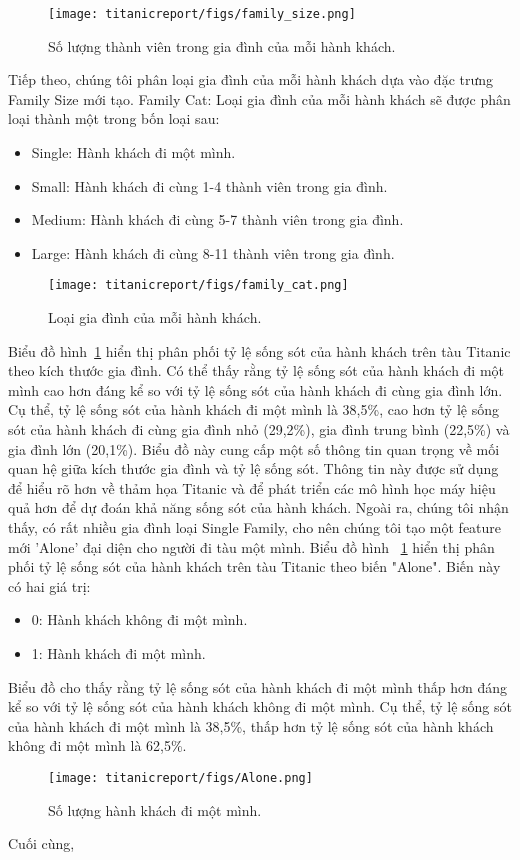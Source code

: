 \documentclass[11pt]{article}
\begin{document}
\begin{figure}[ht]
    \centering
    \texttt{[image: titanicreport/figs/family\_size.png]}
    \caption{Số lượng thành viên trong gia đình của mỗi hành khách.}
\end{figure}
Tiếp theo, chúng tôi phân loại gia đình của mỗi hành khách dựa vào đặc trưng Family Size mới tạo. Family Cat: Loại gia đình của mỗi hành khách sẽ được phân loại thành một trong bốn loại sau:
\begin{itemize}
    \item Single: Hành khách đi một mình.
    \item Small: Hành khách đi cùng 1-4 thành viên trong gia đình.
    \item Medium: Hành khách đi cùng 5-7 thành viên trong gia đình.
    \item Large: Hành khách đi cùng 8-11 thành viên trong gia đình.     
\end{itemize}
\begin{figure}[ht]
    \centering
    \texttt{[image: titanicreport/figs/family\_cat.png]}
    \caption{Loại gia đình của mỗi hành khách.}
    \label{fig:family_cat}
\end{figure}
Biểu đồ hình~\ref{fig:family_cat} hiển thị phân phối tỷ lệ sống sót của hành khách trên tàu Titanic theo kích thước gia đình. Có thể thấy rằng tỷ lệ sống sót của hành khách đi một mình cao hơn đáng kể so với tỷ lệ sống sót của hành khách đi cùng gia đình lớn. Cụ thể, tỷ lệ sống sót của hành khách đi một mình là 38,5\%, cao hơn tỷ lệ sống sót của hành khách đi cùng gia đình nhỏ (29,2\%), gia đình trung bình (22,5\%) và gia đình lớn (20,1\%).
Biểu đồ này cung cấp một số thông tin quan trọng về mối quan hệ giữa kích thước gia đình và tỷ lệ sống sót. Thông tin này được sử dụng để hiểu rõ hơn về thảm họa Titanic và để phát triển các mô hình học máy hiệu quả hơn để dự đoán khả năng sống sót của hành khách.
Ngoài ra, chúng tôi nhận thấy, có rất nhiều gia đình loại Single Family, cho nên chúng tôi tạo một feature mới 'Alone' đại diện cho người đi tàu một mình. Biểu đồ hình ~\ref{fig:family_cat} hiển thị phân phối tỷ lệ sống sót của hành khách trên tàu Titanic theo biến "Alone". Biến này có hai giá trị:
\begin{itemize}
    \item 0: Hành khách không đi một mình.
    \item 1: Hành khách đi một mình.
\end{itemize}
Biểu đồ cho thấy rằng tỷ lệ sống sót của hành khách đi một mình thấp hơn đáng kể so với tỷ lệ sống sót của hành khách không đi một mình. Cụ thể, tỷ lệ sống sót của hành khách đi một mình là 38,5\%, thấp hơn tỷ lệ sống sót của hành khách không đi một mình là 62,5\%.\\
\begin{figure}[ht]
    \centering
    \texttt{[image: titanicreport/figs/Alone.png]}
    \caption{Số lượng hành khách đi một mình.}
    \label{fig:Alone}
\end{figure}
Cuối cùng, 
\end{document}
